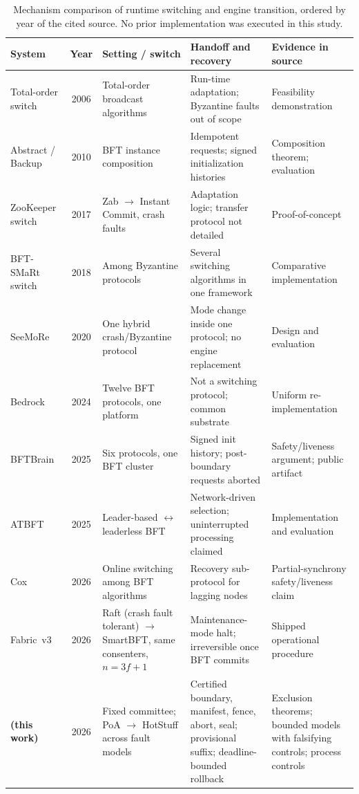 \begin{table}[t]
\centering
\caption{Mechanism comparison of runtime switching and engine transition, ordered by year of the
cited source. No prior implementation was executed in this study.}
\label{tab:switchcompare}
\small
\setlength{\tabcolsep}{4pt}
\renewcommand{\arraystretch}{1.12}
\begin{tabularx}{\textwidth}{@{}L{0.14\textwidth}c L{0.20\textwidth} Y L{0.21\textwidth}@{}}
\toprule
\textbf{System} & \textbf{Year} & \textbf{Setting / switch} & \textbf{Handoff and recovery} & \textbf{Evidence in source} \\
\midrule
Total-order switch~\cite{runtimeorder} & 2006 & Total-order broadcast algorithms & Run-time adaptation; Byzantine faults out of scope & Feasibility demonstration \\
Abstract / Backup~\cite{abstracteurosys,abstract} & 2010 & BFT instance composition & Idempotent requests; signed initialization histories & Composition theorem; evaluation \\
ZooKeeper switch~\cite{zkswitch} & 2017 & Zab $\to$ Instant Commit, crash faults & Adaptation logic; transfer protocol not detailed & Proof-of-concept \\
BFT-SMaRt switch~\cite{dynamicbft} & 2018 & Among Byzantine protocols & Several switching algorithms in one framework & Comparative implementation \\
SeeMoRe~\cite{seemore} & 2020 & One hybrid crash/Byzantine protocol & Mode change inside one protocol; no engine replacement & Design and evaluation \\
Bedrock~\cite{bedrock} & 2024 & Twelve BFT protocols, one platform & Not a switching protocol; common substrate & Uniform re-implementation \\
BFTBrain~\cite{bftbrain} & 2025 & Six protocols, one BFT cluster & Signed init history; post-boundary requests aborted & Safety/liveness argument; public artifact \\
ATBFT~\cite{atbft} & 2025 & Leader-based $\leftrightarrow$ leaderless BFT & Network-driven selection; uninterrupted processing claimed & Implementation and evaluation \\
Cox~\cite{cox} & 2026 & Online switching among BFT algorithms & Recovery sub-protocol for lagging nodes & Partial-synchrony safety/liveness claim \\
Fabric~v3~\cite{fabricbftmigration} & 2026 & Raft (crash fault tolerant) $\to$ SmartBFT, same consenters, $n=3f+1$ & Maintenance-mode halt; irreversible once BFT commits & Shipped operational procedure \\
\midrule
{}
\textbf{\sage{} (this work)} & 2026 & Fixed committee; PoA $\to$ HotStuff across fault models & Certified boundary, manifest, fence, abort, seal; provisional suffix; deadline-bounded rollback & Exclusion theorems; bounded models with falsifying controls; process controls \\
\bottomrule
\end{tabularx}
\end{table}
